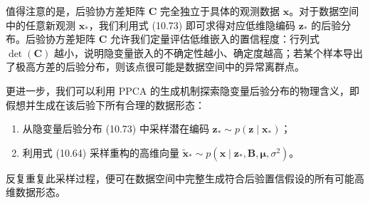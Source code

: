 值得注意的是，后验协方差矩阵 $ \boldsymbol{C} $ 完全独立于具体的观测数据 $ \boldsymbol{x} $。对于数据空间中的任意新观测 $ \boldsymbol{x}_* $，我们利用式 (10.73) 即可求得对应低维隐编码 $ \boldsymbol{z}_* $ 的后验分布。后验协方差矩阵 $ \boldsymbol{C} $ 允许我们定量评估低维嵌入的置信程度：行列式 $ \det(\boldsymbol{C}) $ 越小，说明隐变量嵌入的不确定性越小、确定度越高；若某个样本导出了极高方差的后验分布，则该点很可能是数据空间中的异常离群点。

更进一步，我们可以利用 PPCA 的生成机制探索隐变量后验分布的物理含义，即假想并生成在该后验下所有合理的数据形态：

\begin{enumerate}
\item 从隐变量后验分布 (10.73) 中采样潜在编码 $ \boldsymbol{z}_* \sim p(\boldsymbol{z} \mid \boldsymbol{x}_*) $；
\item 利用式 (10.64) 采样重构的高维向量 $ \tilde{\boldsymbol{x}}_* \sim p(\boldsymbol{x} \mid \boldsymbol{z}_*, \boldsymbol{B}, \boldsymbol{\mu}, \sigma^2) $。
\end{enumerate}

反复重复此采样过程，便可在数据空间中完整生成符合后验置信假设的所有可能高维数据形态。
